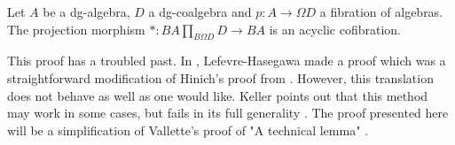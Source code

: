 \documentclass[../thesis.tex]{subfiles}
\begin{document}
            \begin{center}
            \end{center}

            \begin{lemma}\label{lem: tech-fac}
                Let $A$ be a dg-algebra, $D$ a dg-coalgebra and $p: A \rightarrow \Omega D$ a fibration of algebras. The projection morphism $\ast : BA\prod_{B\Omega D}D \rightarrow BA$ is an acyclic cofibration.
                \begin{center}
                \end{center}
            \end{lemma}

            This proof has a troubled past. In \cite{LefevreHasegawa03}, Lefevre-Hasegawa made a proof which was a straightforward modification of Hinich's proof from \cite{Hinich01}. However, this translation does not behave as well as one would like. Keller points out that this method may work in some cases, but fails in its full generality \cite{Keller06}. The proof presented here will be a simplification of Vallette's proof of "A technical lemma" \cite{Vallette20}.
\end{document}

